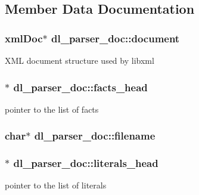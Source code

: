 \subsection{Member Data Documentation}
\subsubsection[{\texorpdfstring{document}{document}}]{\setlength{\rightskip}{0pt plus 5cm}xml\+Doc$\ast$ dl\+\_\+parser\+\_\+doc\+::document}\hypertarget{structdl__parser__doc_ae8457bf3e2bee4e2d6246c4e34a30169}{}\label{structdl__parser__doc_ae8457bf3e2bee4e2d6246c4e34a30169}
X\+ML document structure used by libxml 
\subsubsection[{\texorpdfstring{facts\+\_\+head}{facts_head}}]{$\ast$ dl\+\_\+parser\+\_\+doc\+::facts\+\_\+head}\hypertarget{structdl__parser__doc_a6461d9de58fd2f3404680ca1d7e960f1}{}\label{structdl__parser__doc_a6461d9de58fd2f3404680ca1d7e960f1}
pointer to the list of facts 
\subsubsection[{\texorpdfstring{filename}{filename}}]{\setlength{\rightskip}{0pt plus 5cm}char$\ast$ dl\+\_\+parser\+\_\+doc\+::filename}\hypertarget{structdl__parser__doc_a723ad524e546b52a5b73a4bb6ea43f53}{}\label{structdl__parser__doc_a723ad524e546b52a5b73a4bb6ea43f53}
\subsubsection[{\texorpdfstring{literals\+\_\+head}{literals_head}}]{$\ast$ dl\+\_\+parser\+\_\+doc\+::literals\+\_\+head}\hypertarget{structdl__parser__doc_a85697af981ba61663c7c8e322f596de9}{}\label{structdl__parser__doc_a85697af981ba61663c7c8e322f596de9}
pointer to the list of literals 
